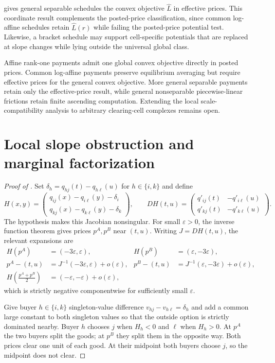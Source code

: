 \documentclass[11pt,a4paper,fleqn]{article}
\theoremstyle{plain}
\theoremstyle{definition}
\newcommand{\eps}{\varepsilon}
\begin{document}
 gives general separable schedules the convex objective $\widehat L$ in effective prices. This coordinate result complements the posted-price classification, since common log-affine schedules retain $\widehat L(r)$ while failing the posted-price potential test. Likewise, a bracket schedule may support cell-specific potentials that are replaced at slope changes while lying outside the universal global class.

Affine rank-one payments admit one global convex objective directly in posted prices. Common log-affine payments preserve equilibrium averaging but require effective prices for the general convex objective. More general separable payments retain only the effective-price result, while general nonseparable piecewise-linear frictions retain finite ascending computation. Extending the local scale-compatibility analysis to arbitrary clearing-cell complexes remains open.
\clearpage
\appendix
\renewcommand{\thelemma}{\Alph{section}.\arabic{lemma}}
\setcounter{table}{0}
\setcounter{figure}{0}

\section{Local slope obstruction and marginal factorization}\label{app:factorization}

\begin{proof}[Proof of ]
Set $\delta_h=q_{hj}(t)-q_{h\ell}(u)$ for $h\in\{i,k\}$ and define
\begin{equation}\label{eq:H-smooth}
H(x,y)=
\begin{pmatrix}
q_{ij}(x)-q_{i\ell}(y)-\delta_i\\
q_{kj}(x)-q_{k\ell}(y)-\delta_k
\end{pmatrix},
\qquad
DH(t,u)=
\begin{pmatrix}
q'_{ij}(t)&-q'_{i\ell}(u)\\
q'_{kj}(t)&-q'_{k\ell}(u)
\end{pmatrix}.
\end{equation}
The hypothesis makes this Jacobian nonsingular. For small $\eps>0$, the inverse function theorem gives prices $p^A,p^B$ near $(t,u)$. Writing $J=DH(t,u)$, the relevant expansions are
\begin{align*}
H(p^A)&=(-3\eps,\eps),
&H(p^B)&=(\eps,-3\eps),\\
p^A-(t,u)&=J^{-1}(-3\eps,\eps)+o(\eps),
&p^B-(t,u)&=J^{-1}(\eps,-3\eps)+o(\eps),\\
H\left(\frac{p^A+p^B}{2}\right)&=(-\eps,-\eps)+o(\eps),
\end{align*}
which is strictly negative componentwise for sufficiently small $\eps$.

Give buyer $h\in\{i,k\}$ singleton-value difference $v_{hj}-v_{h\ell}=\delta_h$ and add a common large constant to both singleton values so that the outside option is strictly dominated nearby. Buyer $h$ chooses $j$ when $H_h<0$ and $\ell$ when $H_h>0$. At $p^A$ the two buyers split the goods; at $p^B$ they split them in the opposite way. Both prices clear one unit of each good. At their midpoint both buyers choose $j$, so the midpoint does not clear.
\end{proof}
\end{document}
